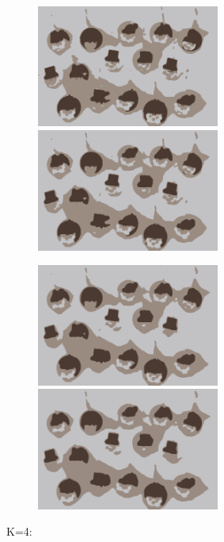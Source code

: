 \begin{center}
\begin{figure}[H]
\centering\includegraphics[width=6cm]{./imgkmeanscluster03-02.png}
\centering\includegraphics[width=6cm]{./imgkmeanscluster03-03.png}\\
\end{figure}
\end{center}
\begin{center}
\begin{figure}[H]
\centering\includegraphics[width=6cm]{./imgkmeanscluster03-04.png}
\centering\includegraphics[width=6cm]{./imgkmeanscluster03-05.png}\\
\end{figure}
\end{center}
K=4:\\
